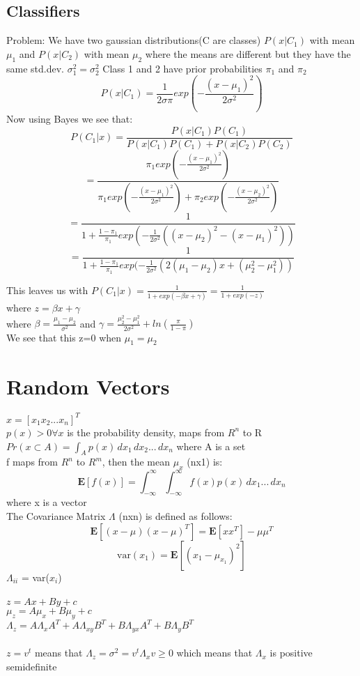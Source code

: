 \documentclass{article}
\begin{document}
\subsection{Classifiers}
Problem: We have two gaussian distributions(C are classes) $P(x|C_1)$ with mean $\mu_1$ and $P(x|C_2)$ with mean $\mu_2$ where the means are different but they have the same std.dev. $\sigma_1^2 = \sigma_2^2$ Class 1 and 2 have prior probabilities $\pi_1$ and $\pi_2$
$$P(x|C_1) = \frac{1}{2 \sigma \pi} exp(-\frac{(x-\mu_1)^2}{2\sigma^2})$$
Now using Bayes we see that:
$$P(C_1 |x) = \frac{P(x|C_1)P(C_1)}{P(x|C_1)P(C_1)+P(x|C_2)P(C_2)}$$
$$= \frac{\pi_1 exp(-\frac{(x-\mu_1)^2}{2\sigma^2})}{\pi_1 exp(-\frac{(x-\mu_1)^2}{2\sigma^2}) + \pi_2 exp(-\frac{(x-\mu_2)^2}{2\sigma^2})}$$
$$=\frac{1}{1 + \frac{1 - \pi_1}{\pi_1} exp(-\frac{1}{2\sigma^2}((x-\mu_2)^2 - (x -\mu_1)^2))}$$
$$=\frac{1}{1 + \frac{1 - \pi_1}{\pi_1} exp(-\frac{1}{2\sigma^2}(2(\mu_1 - \mu_2)x + (\mu_2^2 - \mu_1^2))}$$

This leaves us with $P(C_1|x) = \frac{1}{1 + exp(-\beta x + \gamma)} = \frac{1}{1 + exp(-z)}$ \\
where $z=\beta x + \gamma$ \\
where $\beta = \frac{\mu_1 - \mu_2}{\sigma^2}$ and $\gamma = \frac{\mu_2^2 - \mu_1^2}{2\sigma^2} + ln(\frac{\pi}{1-\pi})$ \\
We see that this z=0 when $\mu_1 = \mu_2$

\section{Random Vectors}
$x = [x_1 x_2 ... x_n]^T$ \\ 
$p(x) > 0 \forall x$ is the probability density, maps from $R^n$ to R \\
$Pr(x \subset A) = \int_A p(x)\,dx_1 \, dx_2 ... \, dx_n$ where A is a set \\ 
f maps from $R^n$ to $R^m$, then the mean $\mu_x$ (nx1) is:
$$\mathbf{E}[f(x)] = \int_{-\infty}^{\infty} \int_{-\infty}^{\infty} f(x)p(x) \, dx_1 ... \, dx_n$$ where x is a vector \\
The Covariance Matrix $\Lambda$ (nxn) is defined as follows:
$$\mathbf{E}[(x-\mu)(x-\mu)^T] = \mathbf{E}[xx^T] - \mu \mu^T$$
$$\textrm{var}(x_1) = \mathbf{E}[(x_1 - \mu_{x_1})^2]$$
$\Lambda_{ii}$ = var($x_i$) \\ \\
$z = Ax + By + c$ \\
$\mu_z = A\mu_x + B\mu_y + c$ \\
$\Lambda_z = A\Lambda_x A^T + A\Lambda_{xy} B^T + B\Lambda_{yx} A^T + B\Lambda_y B^T$ \\ \\
$z = v^t$ means that $\Lambda_z = \sigma^2 = v^t \Lambda_x v \geq 0$ which means that $\Lambda_x$ is positive semidefinite
\end{document}
